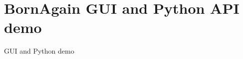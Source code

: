 \documentclass{beamer}
\begin{document}
\section{BornAgain GUI and Python API demo}

\begin{frame}
    \begin{center}
        \LARGE{GUI and Python demo}
    \end{center}
\end{frame}
\end{document}
